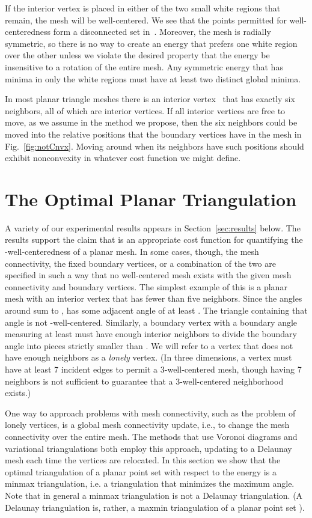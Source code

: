 \documentclass[final]{siamltex}
\begin{document}
If the interior vertex is placed in either of the two small white
regions that remain, the mesh will be well-centered.  We see that the
points permitted for well-centeredness form a disconnected set
in~.  Moreover, the mesh is radially symmetric, so there is
no way to create an energy that prefers one white region over the
other unless we violate the desired property that the energy be
insensitive to a rotation of the entire mesh.  Any symmetric energy
that has minima in only the white regions must have at least two
distinct global minima.

In most planar triangle
meshes there is an interior vertex~ that has exactly
six neighbors, all of which are interior vertices.  If all interior
vertices are free to move, as we assume in the method we propose, then
the six neighbors could be moved into the relative positions that the
boundary vertices have in the mesh in Fig.~\ref{fig:notCnvx}.  Moving
 around when its neighbors have such positions should exhibit
nonconvexity in whatever cost function we might define.


\section{The Optimal Planar Triangulation}
\label{sec:globaltop}

A variety of our experimental results appears in
Section~\ref{sec:results} below.  The results support the claim that
 is an appropriate cost function for quantifying the
-well-centeredness of a planar mesh.  In some cases, though, the
mesh connectivity, the fixed boundary vertices, or a combination of
the two are specified in such a way that no well-centered mesh exists
with the given mesh connectivity and boundary vertices.  The simplest
example of this is a planar mesh with an interior vertex  that has
fewer than five neighbors.  Since the angles around  sum to ,
 has some adjacent angle of at least .  The triangle
containing that angle is not -well-centered.  Similarly, a boundary
vertex with a boundary angle measuring at least  must have
enough interior neighbors to divide the boundary angle into pieces
strictly smaller than .  We will refer to a vertex that does
not have enough neighbors as a \emph{lonely} vertex.  (In three
dimensions, a vertex must have at least 7 incident edges to permit
a 3-well-centered mesh, though having 7 neighbors is not sufficient to
guarantee that a 3-well-centered neighborhood exists.)

One way to approach problems with mesh connectivity, such as the
problem of lonely vertices, is a global mesh connectivity update,
i.e., to change the mesh connectivity over the entire mesh.  The
methods that use Voronoi diagrams \citep{DuFaGu1999} and variational
triangulations \cite{AlCoYvDe2005} both employ this approach, updating
to a Delaunay mesh each time the vertices are relocated.  In this
section we show that the optimal triangulation of a planar point set
with respect to the energy  is a minmax triangulation,
i.e. a triangulation that minimizes the maximum angle.  Note that in
general a minmax triangulation is not a Delaunay triangulation.  (A
Delaunay triangulation is, rather, a maxmin triangulation of a planar
point set \cite{Sibson1978}).
\end{document}
